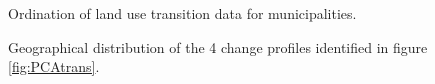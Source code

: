 \begin{figure}[h!]
\caption{Ordination of land use transition data for municipalities.}
\label{fig:PCAtrans}

\caption{Geographical distribution of the 4 change profiles identified in figure \ref{fig:PCAtrans}.}
\label{fig:maptrans}
\end{figure}

\clearpage